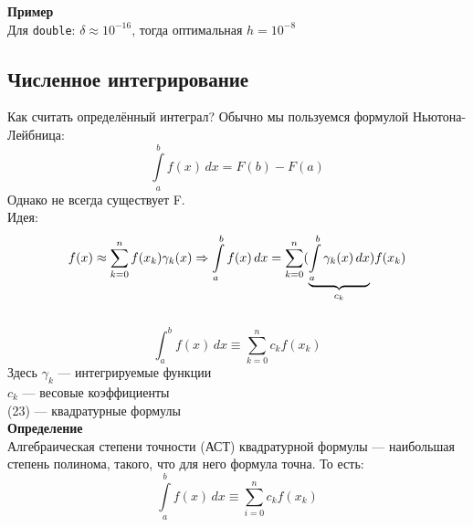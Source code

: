 \textbf{Пример}\\
Для \texttt{double}: $\delta \approx 10^{-16}$, тогда оптимальная $h = 10^{-8}$

\subsection{Численное интегрирование}
Как считать определённый интеграл? Обычно мы пользуемся формулой Ньютона-Лейбница:
\begin{equation}
\int\limits_{a}^{b} f(x) \, dx = F(b) - F(a)
\end{equation}
Однако не всегда существует F.\\
Идея:\\
\[
f(x) \approx \sum\limits_{k=0}^{n}f(x_k)\gamma_k(x) \Rightarrow \int\limits_{a}^{b} f(x) \, dx  =  \sum\limits_{k=0}^{n} ( \underbrace{\int\limits_{a}^{b} \gamma_k(x) \, dx}_{c_k} ) f(x_k)\\
\]\\

\begin{equation}
\int_{a}^{b} f(x) \, dx  \equiv  \sum\limits_{k=0}^{n} {c_k}  f(x_k)
\end{equation}
Здесь $\gamma_k$ --- интегрируемые функции\\
$c_k$ --- весовые коэффициенты\\
(23) --- квадратурные формулы\\

\textbf{Определение}\\
Алгебраическая степени точности (АСТ) квадратурной формулы --- наибольшая степень полинома, такого, что для него формула точна. То есть:\\
\[\int\limits_{a}^{b} f(x) \, dx  \equiv  \sum\limits_{i=0}^{n} {c_k}  f(x_k)\]



